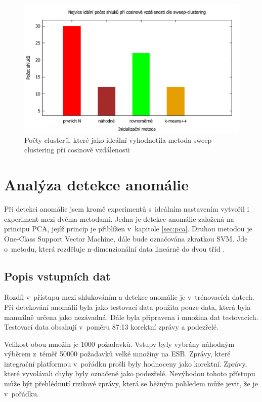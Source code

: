 \documentclass[thesis=M,czech]{FITthesis}[2012/10/20]
\newcommand{\tmpframe}[1]{\fbox{#1}}
\renewcommand{\tmpframe}[1]{#1}
\begin{document}
		\begin{figure}[htb]\centering
			\tmpframe{\includegraphics[width=\textwidth]{./img/cosine-sweep-clusters}}	
			\caption{Počty clusterů, které jako ideální vyhodnotila metoda sweep clustering při cosinově vzdálenosti}
			\label{fig:k-means-num-clusters-cosine}
		\end{figure}
	
		
	\section{Analýza detekce anomálie}
		Při detekci anomálie jsem kromě experimentů s~ideálním nastavením vytvořil i experiment mezi dvěma metodami. Jedna je detekce anomálie založená na principu PCA, jejíž princip je přiblížen v~kapitole \ref{sec:pca}. Druhou metodou je One-Class Support Vector Machine, dále bude označována zkratkou SVM. Jde o~metodu, která rozděluje n-dimenzionální data lineárně do dvou tříd \cite{svm}.
	
		\subsection{Popis vstupních dat}
			Rozdíl v~přístupu mezi shlukováním a detekce anomálie je v~trénovacích datech. Při detekování anomálií byla jako testovací data použita pouze data, která byla manuálně určena jako nezávadná. Dále byla připravena i množina dat testovacích. Testovací data obsahují v~poměru 87:13 korektní zprávy a podezřelé.
		
			Velikost obou množin je 1000 požadavků. Vstupy byly vybrány náhodným výběrem z~téměř 50000 požadavků velké množiny na ESB. Zprávy, které integrační platformou v~pořádku prošli byly hodnoceny jako korektní. Zprávy, které vyvolávali chyby byly označené jako podezřelé. Nevýhodou tohoto přístupu může být přehlédnutí rizikové zprávy, která se běžným pohledem může jevit, že je v~pořádku.
		
\end{document}
